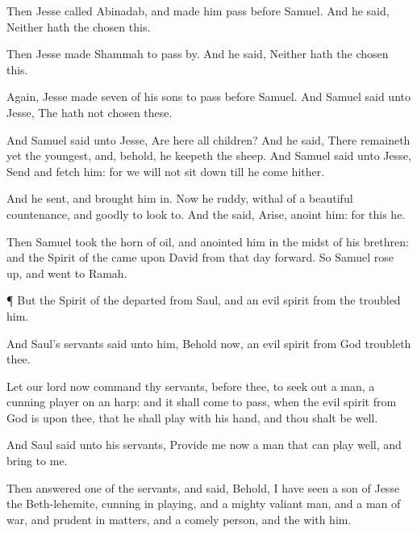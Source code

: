 {Then
Jesse
called
Abinadab, and made him
pass
before
Samuel. And he
said, Neither hath the
{}
chosen this.

Then
Jesse made
Shammah to pass
by. And he
said, Neither hath the
{}
chosen this.

Again,
Jesse made
seven of his
sons to
pass
before
Samuel. And
Samuel
said unto
Jesse, The
{} hath not
chosen these.

And
Samuel
said unto
Jesse, Are here
all
{}
children? And he
said, There
remaineth yet the
youngest, and, behold, he
keepeth the
sheep. And
Samuel
said unto
Jesse,
Send and
fetch him: for we will not sit
down till he
come
hither.

And he
sent, and brought him
in. Now he
{}
ruddy,
{}
withal of a
beautiful
countenance, and
goodly to look
to. And the
{}
said,
Arise,
anoint him: for this
{} he.

Then
Samuel
took the
horn of
oil, and
anointed him in the
midst of his
brethren: and the
Spirit of the
{}
came upon
David from that
day
forward. So
Samuel rose
up, and
went to
Ramah.


\par }{\PP {}¶ But the
Spirit of the
{}
departed from
Saul, and an
evil
spirit from the
{}
troubled him.

And
Saul’s
servants
said unto him, Behold now, an
evil
spirit from
God
troubleth thee.

Let our
lord now
command thy
servants,
{}
before thee, to seek
out a
man,
{} a
cunning
player on an
harp: and it shall come to pass, when the
evil
spirit from
God is upon thee, that he shall
play with his
hand, and thou shalt be
well.

And
Saul
said unto his
servants,
Provide me now a
man that can
play
well, and
bring
{} to me.

Then
answered
one of the
servants, and
said, Behold, I have
seen a
son of
Jesse the
Beth-lehemite,
{}
cunning in
playing, and a
mighty valiant
man, and a
man of
war, and
prudent in
matters, and a
comely
person, and the
{}
{} with him.


}
